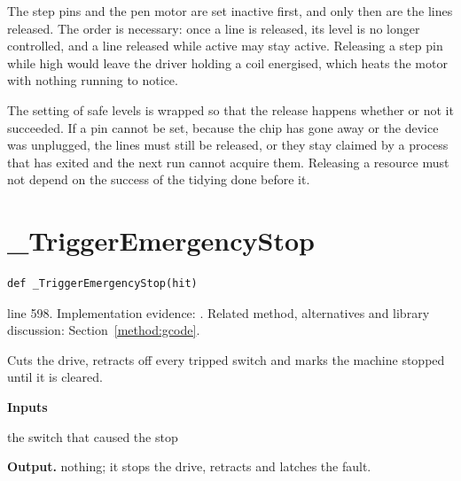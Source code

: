 The step pins and the pen motor are set inactive first, and only then are the lines released. The order is necessary: once a line is released, its level is no longer controlled, and a line released while active may stay active. Releasing a step pin while high would leave the driver holding a coil energised, which heats the motor with nothing running to notice.


The setting of safe levels is wrapped so that the release happens whether or not it succeeded. If a pin cannot be set, because the chip has gone away or the device was unplugged, the lines must still be released, or they stay claimed by a process that has exited and the next run cannot acquire them. Releasing a resource must not depend on the success of the tidying done before it.



\section{\_TriggerEmergencyStop}\label{fn:reproduce:-TriggerEmergencyStop}
\begin{lstlisting}[style=sig]
def _TriggerEmergencyStop(hit)
\end{lstlisting}
 line 598. Implementation evidence: \cite{code2026}. Related method, alternatives and library discussion: Section~\ref{method:gcode}.


Cuts the drive, retracts off every tripped switch and marks the machine stopped until it is cleared.




\noindent\textbf{Inputs}
\begin{description}[leftmargin=2.2em,style=nextline,font=\normalfont\ttfamily]\setlength\itemsep{1pt}
  \item[{hit}] \normalfont the switch that caused the stop
\end{description}

\noindent\textbf{Output.} nothing; it stops the drive, retracts and latches the fault.



